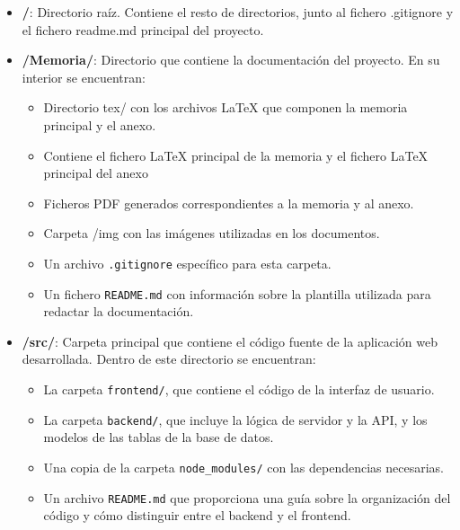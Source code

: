 \begin{itemize}
	
	\item \textbf{/}: Directorio raíz. Contiene el resto de directorios, junto al fichero .gitignore y el fichero readme.md principal del proyecto.
	
    \item \textbf{/Memoria/}: Directorio que contiene la documentación del proyecto. En su interior se encuentran:

    \begin{itemize}
        \item Directorio tex/ con los archivos \LaTeX{} que componen la memoria principal y el anexo.
        \item Contiene el fichero \LaTeX{} principal de la memoria y el fichero \LaTeX{} principal del anexo
        \item Ficheros PDF generados correspondientes a la memoria y al anexo.
        \item Carpeta /img con las imágenes utilizadas en los documentos.
        \item Un archivo \texttt{.gitignore} específico para esta carpeta.
        \item Un fichero \texttt{README.md} con información sobre la plantilla utilizada para redactar la documentación.
    \end{itemize}
    
    \item \textbf{/src/}: Carpeta principal que contiene el código fuente de la aplicación web desarrollada. Dentro de este directorio se encuentran:
    
    \begin{itemize}
          \item La carpeta \texttt{frontend/}, que contiene el código de la interfaz de usuario.
          \item La carpeta \texttt{backend/}, que incluye la lógica de servidor y la API, y los modelos de las tablas de la base de datos.
          \item Una copia de la carpeta \texttt{node\_modules/} con las dependencias necesarias.
          \item Un archivo \texttt{README.md} que proporciona una guía sobre la organización del código y cómo distinguir entre el backend y el frontend.
        \end{itemize}
    	
    \end{itemize}

